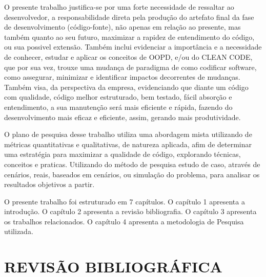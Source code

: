 \documentclass[12pt]{article}
\begin{document}
O presente trabalho justifica-se por uma forte necessidade de ressaltar ao desenvolvedor, a responsabilidade direta pela produção do artefato final da fase de desenvolvimento (código-fonte)\cite{TR_CLEAN_CODE_IMPORTANCIA}, não apenas em relação ao presente, mas também quanto ao seu futuro, maximizar a rapidez de entendimento do código, ou sua possivel extensão. Também inclui evidenciar a importância e a necessidade de conhecer, estudar e aplicar os conceitos de OOPD, e/ou do CLEAN CODE, que por sua vez, trouxe uma mudança de paradigma de como codificar software, como assegurar, minimizar e identificar impactos decorrentes de mudanças\cite{CODE_SIMPLICITY}.
Também visa, da perspectiva da empresa, evidenciando que diante um código com qualidade, código melhor estruturado, bem testado, fácil absorção e entendimento, a sua manutenção será mais eficiente e rápida, fazendo do desenvolvimento mais eficaz e eficiente, assim, gerando mais produtividade.

O plano de pesquisa desse trabalho utiliza uma abordagem mista utilizando de métricas quantitativas e qualitativas, de natureza aplicada, afim de determinar uma estratégia para maximizar a qualidade de código, explorando técnicas, conceitos e praticas. Utilizando do método de pesquisa estudo de caso, através de cenários, reais, baseados em cenários, ou simulação do problema, para analisar os resultados objetivos a partir. 

O presente trabalho foi estruturado em 7 capítulos.
O capítulo 1 apresenta a introdução.
O capítulo 2 apresenta a revisão bibliografia.
O capítulo 3 apresenta os trabalhos relacionados.
O capítulo 4 apresenta a metodologia de Pesquisa utilizada.



\part{REVISÃO BIBLIOGRÁFICA} \label{sec:revisaobibliografica}
\end{document}
